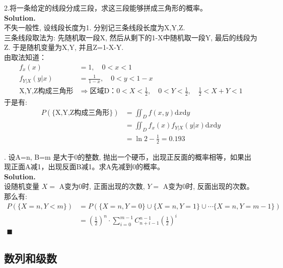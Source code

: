 \documentclass[UTF8]{article}
\begin{document}
\noindent 2.将一条给定的线段分成三段，求这三段能够拼成三角形的概率。 \\
\noindent \textbf{Solution.} \\
不失一般性, 设线段长度为1. 分别记三条线段长度为X,Y,Z. \\
三条线段取法为: 先随机取一段X, 然后从剩下的1-X中随机取一段Y, 最后的线段为Z. 于是随机变量为X,Y, 并且Z=1-X-Y. \\
由取法知道：
\begin{align*}
f_x(x) & = 1, \quad 0<x<1 \\
f_{Y|X}(y|x) & = \frac{1}{1-x}, \quad 0<y<1-x \\
\text{X,Y,Z构成三角形} & \Longrightarrow \text{区域D：}0<X<\frac{1}{2}, \quad 0<Y<\frac{1}{2},\quad \frac{1}{2}<X+Y<1
\end{align*}
于是有: 
\begin{align*}
P(\{\text{X,Y,Z构成三角形}\}) & = \iint_{D} f(x,y)\mathrm{d}x\mathrm{d}y  \\
 & = \iint_{D} f_x(x) f_{Y|X}(y|x) \mathrm{d}x\mathrm{d}y \\
 & = \ln2 - \frac{1}{2}= 0.193
\end{align*}

. 设A=n, B=m 是大于0的整数, 抛出一个硬币，出现正反面的概率相等，如果出现正面A减1，出现反面B减1。求A先减到0的概率。 \\
\noindent \textbf{Solution.} \\
设随机变量 $X=$ A变为0时, 正面出现的次数, $Y=$ A变为0时, 反面出现的次数。 那么有: \\
\begin{align*}
P(\{ X=n, Y<m \})  &= P(\{ X=n, Y=0 \} \cup \{ X=n, Y=1 \} \cup \cdots \{ X=n, Y=m-1 \} )   \\
&= (\frac{1}{2})^n \cdot \sum_{i=0}^{m-1} C_{n+i-1}^{n-1} (\frac{1}{2})^i  \\
\blacksquare 
\end{align*}

\subsection{数列和级数}
\end{document}
